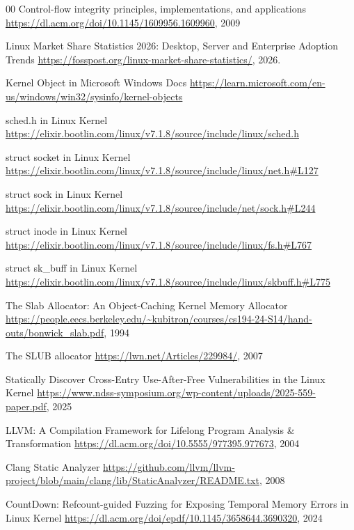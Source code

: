 \begin{thebibliography}{00}
Control-flow integrity principles, implementations, and applications
\url{https://dl.acm.org/doi/10.1145/1609956.1609960}, 2009

Linux Market Share Statistics 2026: Desktop, Server and Enterprise Adoption Trends
\url{https://fosspost.org/linux-market-share-statistics/}, 2026.

Kernel Object in Microsoft Windows Docs
\url{https://learn.microsoft.com/en-us/windows/win32/sysinfo/kernel-objects}

sched.h in Linux Kernel
\url{https://elixir.bootlin.com/linux/v7.1.8/source/include/linux/sched.h}

struct socket in Linux Kernel
\url{https://elixir.bootlin.com/linux/v7.1.8/source/include/linux/net.h#L127}

struct sock in Linux Kernel
\url{https://elixir.bootlin.com/linux/v7.1.8/source/include/net/sock.h#L244}

struct inode in Linux Kernel
\url{https://elixir.bootlin.com/linux/v7.1.8/source/include/linux/fs.h#L767}

struct sk\_buff in Linux Kernel
\url{https://elixir.bootlin.com/linux/v7.1.8/source/include/linux/skbuff.h#L775}

The Slab Allocator: An Object-Caching Kernel Memory Allocator
\url{https://people.eecs.berkeley.edu/~kubitron/courses/cs194-24-S14/hand-outs/bonwick_slab.pdf}, 1994

The SLUB allocator
\url{https://lwn.net/Articles/229984/}, 2007

Statically Discover Cross-Entry Use-After-Free
Vulnerabilities in the Linux Kernel \url{https://www.ndss-symposium.org/wp-content/uploads/2025-559-paper.pdf}, 2025

LLVM: A Compilation Framework for Lifelong Program Analysis \& Transformation
\url{https://dl.acm.org/doi/10.5555/977395.977673}, 2004

Clang Static Analyzer
\url{https://github.com/llvm/llvm-project/blob/main/clang/lib/StaticAnalyzer/README.txt}, 2008

CountDown: Refcount-guided Fuzzing for Exposing Temporal Memory Errors in Linux Kernel \url{https://dl.acm.org/doi/epdf/10.1145/3658644.3690320}, 2024


\end{thebibliography}

